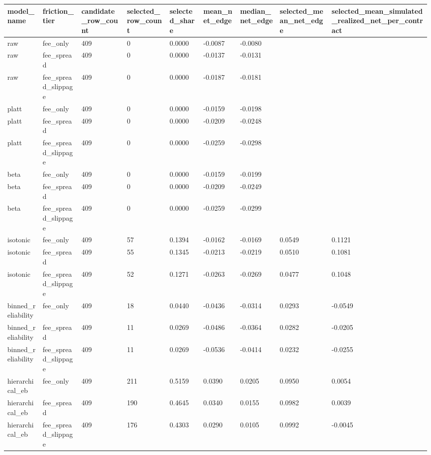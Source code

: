 \begin{tabular}{lllllllll}
\toprule
model\_name & friction\_tier & candidate\_row\_count & selected\_row\_count & selected\_share & mean\_net\_edge & median\_net\_edge & selected\_mean\_net\_edge & selected\_mean\_simulated\_realized\_net\_per\_contract \\
\midrule
raw & fee\_only & 409 & 0 & 0.0000 & -0.0087 & -0.0080 &  &  \\
raw & fee\_spread & 409 & 0 & 0.0000 & -0.0137 & -0.0131 &  &  \\
raw & fee\_spread\_slippage & 409 & 0 & 0.0000 & -0.0187 & -0.0181 &  &  \\
platt & fee\_only & 409 & 0 & 0.0000 & -0.0159 & -0.0198 &  &  \\
platt & fee\_spread & 409 & 0 & 0.0000 & -0.0209 & -0.0248 &  &  \\
platt & fee\_spread\_slippage & 409 & 0 & 0.0000 & -0.0259 & -0.0298 &  &  \\
beta & fee\_only & 409 & 0 & 0.0000 & -0.0159 & -0.0199 &  &  \\
beta & fee\_spread & 409 & 0 & 0.0000 & -0.0209 & -0.0249 &  &  \\
beta & fee\_spread\_slippage & 409 & 0 & 0.0000 & -0.0259 & -0.0299 &  &  \\
isotonic & fee\_only & 409 & 57 & 0.1394 & -0.0162 & -0.0169 & 0.0549 & 0.1121 \\
isotonic & fee\_spread & 409 & 55 & 0.1345 & -0.0213 & -0.0219 & 0.0510 & 0.1081 \\
isotonic & fee\_spread\_slippage & 409 & 52 & 0.1271 & -0.0263 & -0.0269 & 0.0477 & 0.1048 \\
binned\_reliability & fee\_only & 409 & 18 & 0.0440 & -0.0436 & -0.0314 & 0.0293 & -0.0549 \\
binned\_reliability & fee\_spread & 409 & 11 & 0.0269 & -0.0486 & -0.0364 & 0.0282 & -0.0205 \\
binned\_reliability & fee\_spread\_slippage & 409 & 11 & 0.0269 & -0.0536 & -0.0414 & 0.0232 & -0.0255 \\
hierarchical\_eb & fee\_only & 409 & 211 & 0.5159 & 0.0390 & 0.0205 & 0.0950 & 0.0054 \\
hierarchical\_eb & fee\_spread & 409 & 190 & 0.4645 & 0.0340 & 0.0155 & 0.0982 & 0.0039 \\
hierarchical\_eb & fee\_spread\_slippage & 409 & 176 & 0.4303 & 0.0290 & 0.0105 & 0.0992 & -0.0045 \\
\bottomrule
\end{tabular}

